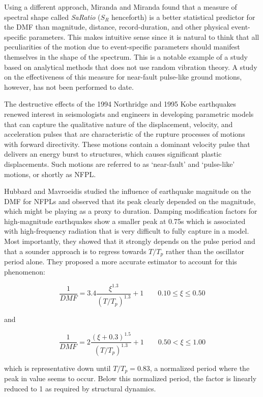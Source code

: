 Using a different approach, Miranda and
Miranda found that a measure of
spectral shape called \emph{SaRatio} (\(S_R\) henceforth) is a better
statistical predictor for the DMF than magnitude, distance,
record-duration, and other physical event-specific parameters. This
makes intuitive sense since it is natural to think that all
peculiarities of the motion due to event-specific parameters should
manifest themselves in the shape of the spectrum. This is a notable
example of a study based on analytical methods that does not use random
vibration theory. A study on the effectiveness of this measure for
near-fault pulse-like ground motions, however, has not been performed to
date.

The destructive effects of the 1994 Northridge and 1995 Kobe earthquakes
renewed interest in seismologists and engineers in developing parametric
models that can capture the qualitative nature of the displacement,
velocity, and acceleration pulses that are characteristic of the rupture
processes of motions with forward directivity. These motions contain a
dominant velocity pulse that delivers an energy burst to structures,
which causes significant plastic displacements. Such motions are
referred to as `near-fault' and `pulse-like' motions, or shortly as
NFPL.

Hubbard and Mavroeidis studied the
influence of earthquake magnitude on the DMF for NFPLs and observed that
its peak clearly depended on the magnitude, which might be playing as a
proxy to duration. Damping modification factors for high-magnitude
earthquakes show a smaller peak at 0.75s which is associated with
high-frequency radiation that is very difficult to fully capture in a
model. Most importantly, they showed that it strongly depends on the
pulse period and that a sounder approach is to regress towards \(T/T_p\)
rather than the oscillator period alone. They proposed a more accurate
estimator to account for this phenomenon:

\[\frac{1}{DMF} = 3.4\frac{\xi^{1.3}}{(T/T_p)^{1.3}} + 1\qquad 0.10 \leq \xi \leq 0.50\]

and

\[\frac{1}{DMF} = 2\frac{(\xi + 0.3)^{1.5}}{(T/T_p)^{1.3}} + 1\qquad 0.50 < \xi \leq 1.00\]

which is representative down until \(T/T_p=0.83\), a normalized period
where the peak in value seems to occur. Below this normalized period,
the factor is linearly reduced to 1 as required by structural dynamics.


